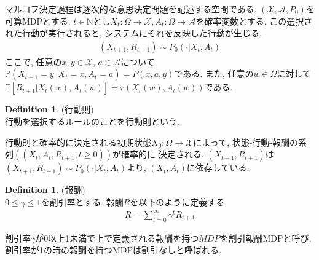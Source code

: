 \documentclass[11pt, a4paper, dvipdfmx]{jsarticle}
\theoremstyle{definition}
\newtheorem{Definition+}[Axiom+]{Definition}
\newcommand{\N}{\mathbb{N}}
\newcommand{\X}{\mathcal{X}}
\newcommand{\A}{\mathcal{A}}
\newcommand{\E}{\mathbb{E}}
\renewcommand{\P}{\mathbb{P}}
\newcommand{\MDP}{(\X, \A, P_{0})}
\begin{document}
マルコフ決定過程は逐次的な意思決定問題を記述する空間である. $\MDP$を可算MDPとする.
$t\in\N$とし$X_{t}:\Omega\to\X, A_{t}:\Omega\to\A$を確率変数とする. 
この選択された行動が実行されると, システムにそれを反映した行動が生じる.
\begin{align*}
    (X_{t + 1}, R_{t + 1})\sim P_{0}(\cdot|X_{t}, A_{t})
\end{align*}
ここで, 任意の$x, y\in\X$, $a\in\A$について$\P(X_{t + 1} = y~|X_{t} = x, A_{t} = a) = P(x, a, y)$である.
また, 任意の$w\in\Omega$に対して$\E[R_{t+1}|X_{t}(w), A_{t}(w)] = r(X_{t}(w), A_{t}(w))$である.

\begin{Definition+}(行動則)\\
    行動を選択するルールのことを行動則という.
\end{Definition+}
行動則と確率的に決定される初期状態$X_{0}:\Omega\to\X$によって, 状態-行動-報酬の系列$((X_{t}, A_{t}, R_{t + 1};t\geq 0 ))$が確率的に
決定される. 
$(X_{t + 1}, R_{t + 1})$は$(X_{t + 1}, R_{t + 1})\sim P_{0}(\cdot|X_{t}, A_{t})$より, $(X_{t}, A_{t})$に依存している.

\begin{Definition+}(報酬)\\
    $0\leq \gamma\leq 1$を割引率とする. 報酬$R$を以下のように定義する.
    \begin{align*}
        R = \sum_{t = 0}^{\infty} \gamma^{t} R_{t + 1}
    \end{align*}
\end{Definition+}
割引率$\gamma$が0以上1未満で上で定義される報酬を持つ$MDP$を割引報酬MDPと呼び, 割引率が1の時の報酬を持つMDPは割引なしと呼ばれる.
\end{document}
